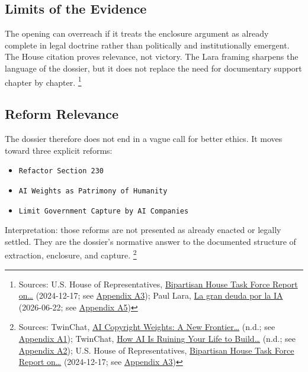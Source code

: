 \documentclass[
  american,
  11pt,
  letterpaper,
]{article}
\providecommand{\tightlist}{%
  \setlength{\itemsep}{0pt}\setlength{\parskip}{0pt}}
\begin{document}
\subsection{Limits of the Evidence}\label{limits-of-the-evidence}

The opening can overreach if it treats the enclosure argument as already
complete in legal doctrine rather than politically and institutionally
emergent. The House citation proves relevance, not victory. The Lara
framing sharpens the language of the dossier, but it does not replace
the need for documentary support chapter by chapter. \footnote{Sources:
  U.S. House of Representatives,
  \href{https://www.speaker.gov/wp-content/uploads/2024/12/AI-Task-Force-Report-FINAL.pdf}{Bipartisan
  House Task Force Report on\ldots{}} (2024-12-17; see
  \hyperref[ch-00-appendix-a3-bipartisan-house-task-force-report-on-artificial-intelligence]{Appendix
  A3}); Paul Lara,
  \href{https://www.dineroenimagen.com/paul-lara/la-gran-deuda-por-la-ia/186930}{La
  gran deuda por la IA} (2026-06-22; see
  \hyperref[ch-00-appendix-a5-la-gran-deuda-por-la-ia]{Appendix A5})}

\subsection{Reform Relevance}\label{reform-relevance}

The dossier therefore does not end in a vague call for better ethics. It
moves toward three explicit reforms:

\begin{itemize}
\tightlist
\item
  \texttt{Refactor\ Section\ 230}
\item
  \texttt{AI\ Weights\ as\ Patrimony\ of\ Humanity}
\item
  \texttt{Limit\ Government\ Capture\ by\ AI\ Companies}
\end{itemize}

Interpretation: those reforms are not presented as already enacted or
legally settled. They are the dossier's normative answer to the
documented structure of extraction, enclosure, and capture. \footnote{Sources:
  TwinChat,
  \href{https://medium.com/twinchat/ai-copyright-weights-a-new-frontier-in-intellectual-property-law-d8ee1b6c55ee}{AI
  Copyright Weights: A New Frontier\ldots{}} (n.d.; see
  \hyperref[ch-00-appendix-a1-ai-copyright-weights-a-new-frontier-in-intellectual-property-law]{Appendix
  A1}); TwinChat,
  \href{https://medium.com/twinchat/how-ai-is-ruining-your-life-to-build-an-empire-8b6d02e55bc9}{How
  AI Is Ruining Your Life to Build\ldots{}} (n.d.; see
  \hyperref[ch-00-appendix-a2-how-ai-is-ruining-your-life-to-build-an-empire]{Appendix
  A2}); U.S. House of Representatives,
  \href{https://www.speaker.gov/wp-content/uploads/2024/12/AI-Task-Force-Report-FINAL.pdf}{Bipartisan
  House Task Force Report on\ldots{}} (2024-12-17; see
  \hyperref[ch-00-appendix-a3-bipartisan-house-task-force-report-on-artificial-intelligence]{Appendix
  A3})}
\end{document}
